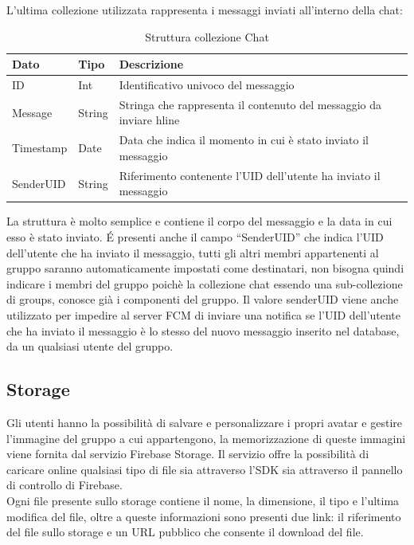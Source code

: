       
\newpage

L'ultima collezione utilizzata rappresenta i messaggi inviati all'interno della chat:


\begin{table}[h]
\begin{center}
\begin{tabular}{|l|l|p{10cm}|}
    \hline
\textbf{Dato} & \textbf{Tipo}  & \textbf{Descrizione}\\ \hline
ID & Int & Identificativo univoco del messaggio\\ \hline
Message & String & Stringa che rappresenta il contenuto del messaggio da inviare hline\\ \hline
Timestamp & Date & Data che indica il momento in cui è stato inviato il messaggio\\ \hline
SenderUID & String & Riferimento contenente l'UID dell'utente ha inviato il messaggio \\
\hline
\end{tabular}
\caption[Collezione Chat]{Struttura collezione Chat}\label{tab:Strutture collezione Chat}
\end{center}
\end{table}
La struttura è molto semplice e contiene il corpo del messaggio e la data in cui esso è stato inviato. \'E presenti anche il campo ``SenderUID'' che indica l'UID dell'utente che ha inviato il messaggio, tutti gli altri membri appartenenti al gruppo saranno automaticamente impostati come destinatari, non bisogna quindi indicare i membri del gruppo poichè la collezione chat essendo una sub-collezione di groups, conosce già i componenti del gruppo.
Il valore senderUID viene anche utilizzato per impedire al server FCM di inviare una notifica se l'UID dell'utente che ha inviato il messaggio è lo stesso del nuovo messaggio inserito nel database, da un qualsiasi utente del gruppo.\\



\newpage

\subsection{Storage}
Gli utenti hanno la possibilità di salvare e personalizzare i propri avatar e gestire l'immagine del gruppo a cui appartengono, la memorizzazione di queste immagini viene fornita dal servizio Firebase Storage.
Il servizio offre la possibilità di caricare online qualsiasi tipo di file sia attraverso l'SDK sia attraverso il pannello di controllo di Firebase.\\
Ogni file presente sullo storage contiene il nome, la dimensione, il tipo e l'ultima modifica del file, oltre a queste informazioni sono presenti due link: il riferimento del file sullo storage e un URL pubblico che consente il download del file.

